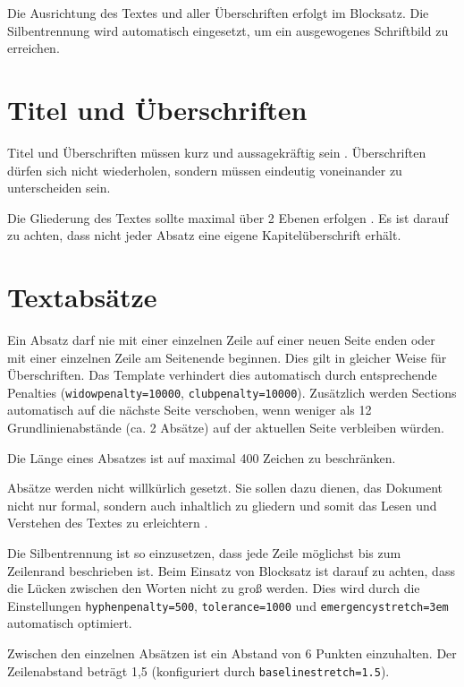 Die Ausrichtung des Textes und aller Überschriften erfolgt im Blocksatz. Die Silbentrennung wird automatisch eingesetzt, um ein ausgewogenes Schriftbild zu erreichen.

\section{Titel und Überschriften}
\label{sec:titel_ueberschriften}

Titel und Überschriften müssen kurz und aussagekräftig sein \parencite{reiter2011}. Überschriften dürfen sich nicht wiederholen, sondern müssen eindeutig voneinander zu unterscheiden sein.

Die Gliederung des Textes sollte maximal über 2 Ebenen erfolgen \parencite{ahrens2014,brunner2015}. Es ist darauf zu achten, dass nicht jeder Absatz eine eigene Kapitelüberschrift erhält.

\section{Textabsätze}
\label{sec:textabsaetze}

Ein Absatz darf nie mit einer einzelnen Zeile auf einer neuen Seite enden oder mit einer einzelnen Zeile am Seitenende beginnen. Dies gilt in gleicher Weise für Überschriften. Das Template verhindert dies automatisch durch entsprechende Penalties (\texttt{widowpenalty=10000}, \texttt{clubpenalty=10000}). Zusätzlich werden Sections automatisch auf die nächste Seite verschoben, wenn weniger als 12 Grundlinienabstände (ca. 2 Absätze) auf der aktuellen Seite verbleiben würden.

Die Länge eines Absatzes ist auf maximal 400 Zeichen zu beschränken.

Absätze werden nicht willkürlich gesetzt. Sie sollen dazu dienen, das Dokument nicht nur formal, sondern auch inhaltlich zu gliedern und somit das Lesen und Verstehen des Textes zu erleichtern \parencite{wagner2007}.

Die Silbentrennung ist so einzusetzen, dass jede Zeile möglichst bis zum Zeilenrand beschrieben ist. Beim Einsatz von Blocksatz ist darauf zu achten, dass die Lücken zwischen den Worten nicht zu groß werden. Dies wird durch die Einstellungen \texttt{hyphenpenalty=500}, \texttt{tolerance=1000} und \texttt{emergencystretch=3em} automatisch optimiert.

Zwischen den einzelnen Absätzen ist ein Abstand von 6 Punkten einzuhalten. Der Zeilenabstand beträgt 1,5 (konfiguriert durch \texttt{baselinestretch=1.5}).

